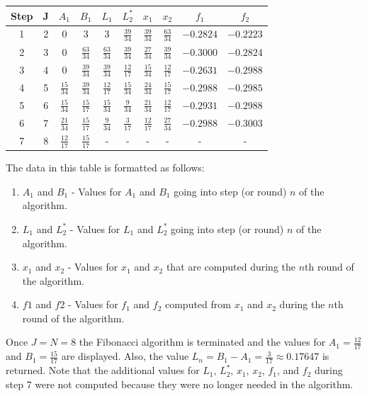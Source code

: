 \documentclass[11pt]{article}
\begin{document}
\begin{sol}
\begin{center}
  \begin{tabular}{| c | c | c | c | c | c | c | c | c | c |}
    \hline
	Step & J & $A_{1}$ & $B_{1}$ & \textbf{$L_{1}$} & \textbf{$L_{2}^{*}$} & $x_1$ & $x_2$ & $f_1$ & $f_2$\\ \hline
	1 & 2 & 0 & 3 & 3 & $\frac{39}{34}$ & $\frac{39}{34}$ & $\frac{63}{34}$ & $-0.2824$ & $-0.2223$ \\ \hline
	2 & 3 & 0 & $\frac{63}{34}$ & $\frac{63}{34}$ & $\frac{39}{34}$ & $\frac{27}{34}$ & $\frac{39}{34}$ & $-0.3000$ & $-0.2824$\\ \hline
	3 & 4 & 0 & $\frac{39}{34}$ & $\frac{39}{34}$ & $\frac{12}{17}$ & $\frac{15}{34}$ & $\frac{12}{17}$ & $-0.2631$ & $-0.2988$\\ \hline
	4 & 5 & $\frac{15}{34}$ & $\frac{39}{34}$ & $\frac{12}{17}$ & $\frac{15}{34}$ & $\frac{24}{34}$ & $\frac{15}{17}$ & $-0.2988$ & $-0.2985$\\ \hline
	5 & 6 & $\frac{15}{34}$ & $\frac{15}{17}$ & $\frac{15}{34}$ & $\frac{9}{34}$ & $\frac{21}{34}$ & $\frac{12}{17}$ & $-0.2931$ & $-0.2988$\\ \hline
	6 & 7 & $\frac{21}{34}$ & $\frac{15}{17}$ & $\frac{9}{34}$ & $\frac{3}{17}$ & $\frac{12}{17}$ & $\frac{27}{34}$ & $-0.2988$ & $-0.3003$\\ \hline
	7 & 8 & $\frac{12}{17}$ & $\frac{15}{17}$ & - & - & - & - & - & -\\ \hline
  \end{tabular}
\end{center}

The data in this table is formatted as follows:

\begin{enumerate}
	\item $A_1$ and $B_1$ - Values for $A_1$ and $B_1$ going into step (or round) $n$ of the algorithm.
	\item $L_1$ and $L_2^*$ - Values for $L_1$ and $L_2^*$ going into step (or round) $n$ of the algorithm.
	\item $x_1$ and $x_2$ - Values for $x_1$ and $x_2$ that are computed during the $n$th round of the algorithm.
	\item $f1$ and $f2$ - Values for $f_1$ and $f_2$ computed from $x_1$ and $x_2$ during the $n$th round of the algorithm.
\end{enumerate}

Once $J=N=8$ the Fibonacci algorithm is terminated and the values for $A_1 = \frac{12}{17}$ and $B_1 = \frac{15}{17}$ are displayed. Also, the value $L_n = B_1 - A_1 = \frac{3}{17} \approx 0.17647$ is returned. Note that the additional values for $L_{1}$, $L_{2}^*$, $x_1$, $x_2$, $f_1$, and $f_2$ during step $7$ were not computed because they were no longer needed in the algorithm. 


\end{sol}
\end{document}
